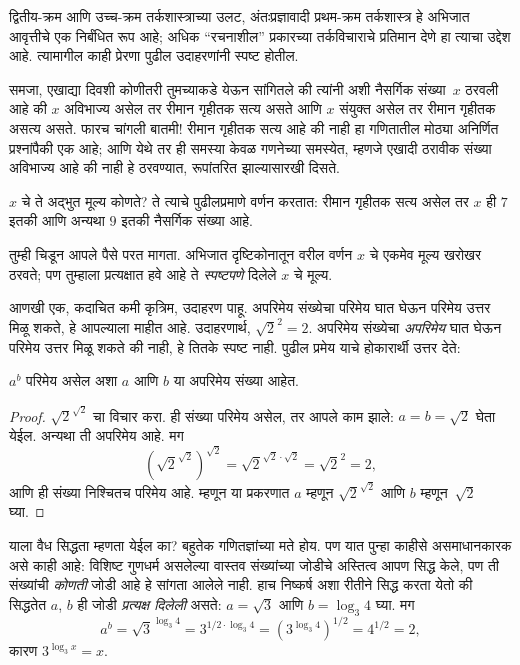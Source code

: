 \documentclass[../../../include/open-logic-section]{subfiles}
\begin{document}


द्वितीय-क्रम आणि उच्च-क्रम तर्कशास्त्राच्या उलट, अंतःप्रज्ञावादी प्रथम-क्रम
तर्कशास्त्र हे अभिजात आवृत्तीचे एक निर्बंधित रूप आहे; अधिक “रचनाशील” प्रकारच्या
तर्कविचाराचे प्रतिमान देणे हा त्याचा उद्देश आहे. त्यामागील काही प्रेरणा पुढील
उदाहरणांनी स्पष्ट होतील.

समजा, एखाद्या दिवशी कोणीतरी तुमच्याकडे येऊन सांगितले की त्यांनी अशी नैसर्गिक
संख्या~$x$ ठरवली आहे की $x$ अविभाज्य असेल तर रीमान गृहीतक सत्य असते आणि $x$
संयुक्त असेल तर रीमान गृहीतक असत्य असते. फारच चांगली बातमी!{} रीमान गृहीतक
सत्य आहे की नाही हा गणितातील मोठ्या अनिर्णित प्रश्नांपैकी एक आहे; आणि येथे तर
ही समस्या केवळ गणनेच्या समस्येत, म्हणजे एखादी ठरावीक संख्या अविभाज्य आहे की
नाही हे ठरवण्यात, रूपांतरित झाल्यासारखी दिसते.

$x$ चे ते अद्भुत मूल्य कोणते? ते त्याचे पुढीलप्रमाणे वर्णन करतात: रीमान गृहीतक
सत्य असेल तर $x$ ही $7$ इतकी आणि अन्यथा $9$ इतकी नैसर्गिक संख्या आहे.

तुम्ही चिडून आपले पैसे परत मागता. अभिजात दृष्टिकोनातून वरील वर्णन $x$ चे
एकमेव मूल्य खरोखर ठरवते; पण तुम्हाला प्रत्यक्षात हवे आहे ते
\emph{स्पष्टपणे} दिलेले $x$ चे मूल्य.

आणखी एक, कदाचित कमी कृत्रिम, उदाहरण पाहू. अपरिमेय संख्येचा परिमेय घात घेऊन
परिमेय उत्तर मिळू शकते, हे आपल्याला माहीत आहे. उदाहरणार्थ,
$\sqrt{2}^2 = 2$. अपरिमेय संख्येचा \emph{अपरिमेय} घात घेऊन परिमेय उत्तर
मिळू शकते की नाही, हे तितके स्पष्ट नाही. पुढील प्रमेय याचे होकारार्थी उत्तर
देते:

\begin{thm}
$a^b$ परिमेय असेल अशा $a$ आणि $b$ या अपरिमेय संख्या आहेत.
\end{thm}

\begin{proof}
$\sqrt{2}^{\sqrt{2}}$ चा विचार करा. ही संख्या परिमेय असेल, तर आपले काम झाले:
$a = b = \sqrt{2}$ घेता येईल. अन्यथा ती अपरिमेय आहे. मग
\[
(\sqrt{2}^{\sqrt{2}})^{\sqrt{2}} = \sqrt{2}^{\sqrt{2} \cdot
  \sqrt{2}} = \sqrt{2}^2 = 2,
\]
आणि ही संख्या निश्चितच परिमेय आहे. म्हणून या प्रकरणात $a$ म्हणून
$\sqrt{2}^{\sqrt{2}}$ आणि $b$ म्हणून~$\sqrt 2$ घ्या.
\end{proof}

याला वैध सिद्धता म्हणता येईल का? बहुतेक गणितज्ञांच्या मते होय. पण यात पुन्हा
काहीसे असमाधानकारक असे काही आहे: विशिष्ट गुणधर्म असलेल्या वास्तव संख्यांच्या
जोडीचे अस्तित्व आपण सिद्ध केले, पण ती संख्यांची \emph{कोणती} जोडी आहे हे
सांगता आलेले नाही. हाच निष्कर्ष अशा रीतीने सिद्ध करता येतो की सिद्धतेत
$a$, $b$ ही जोडी \emph{प्रत्यक्ष दिलेली} असते: $a = \sqrt{3}$ आणि
$b = \log_3 4$ घ्या. मग
\[
a^b = \sqrt{3}^{\log_3 4} = 3^{1/2 \cdot \log_3 4} = (3^{\log_3
  4})^{1/2} = 4^{1/2}= 2,
\]
कारण $3^{\log_3 x} = x$.
\end{document}
